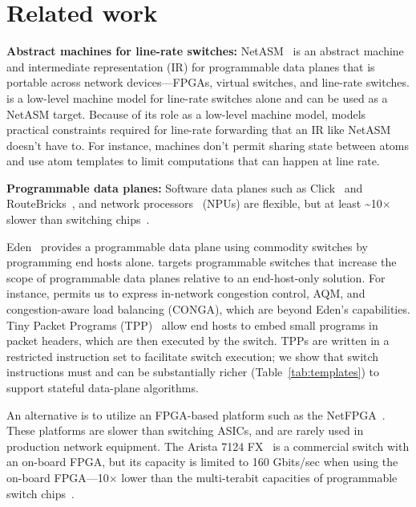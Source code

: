 \section{Related work}
\label{s:related}
\textbf{Abstract machines for line-rate switches:}
NetASM~\cite{netasm} is an abstract machine and intermediate representation
(IR) for programmable data planes that is portable across network
devices---FPGAs, virtual switches, and line-rate switches.  \absmachine is a
low-level machine model for line-rate switches alone and can be used as a
NetASM target. Because of its role as a low-level machine model, \absmachine
models practical constraints required for line-rate forwarding that an IR like
NetASM doesn't have to. For instance, \absmachine machines don't permit sharing
state between atoms and use atom templates to limit computations that can
happen at line rate.


\textbf{Programmable data planes:}
Software data planes such as Click~\cite{click} and
RouteBricks~\cite{routebricks}, and network processors~\cite{ixp4xx} (NPUs) are
flexible, but at least \textasciitilde10$\times$ slower than switching
chips~\cite{rmt}.

Eden~\cite{eden} provides a programmable data plane using commodity switches by
programming end hosts alone. \pktlanguage targets programmable switches that
increase the scope of programmable data planes relative to an end-host-only
solution. For instance, \pktlanguage permits us to express in-network
congestion control, AQM, and congestion-aware load balancing (CONGA), which are
beyond Eden's capabilities. Tiny Packet Programs (TPP)~\cite{tpp} allow end
hosts to embed small programs in packet headers, which are then executed by the
switch. TPPs are written in a restricted instruction set to facilitate switch
execution; we show that switch instructions must and can be substantially
richer (Table~\ref{tab:templates}) to support stateful data-plane algorithms.

An alternative is to utilize an FPGA-based platform such as the NetFPGA~\cite{netfpga}.
These platforms are
slower than switching ASICs, and are rarely used in production network
equipment. The Arista 7124 FX~\cite{7124fx} is a commercial switch with an
on-board FPGA, but its capacity is limited to 160 Gbits/sec when using the
on-board FPGA---10$\times$ lower than the multi-terabit capacities of programmable
switch chips~\cite{xpliant, tofino}.

